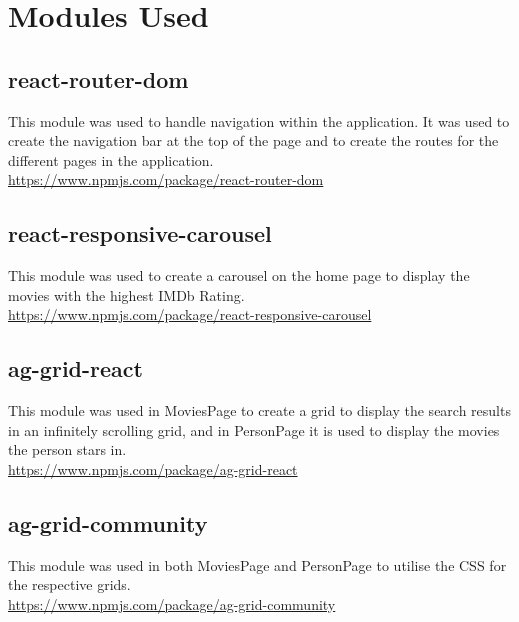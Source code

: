 \documentclass[12pt,a4paper]{article}
\begin{document}
	\newpage

	\section{Modules Used}
		\subsection{react-router-dom}
			This module was used to handle navigation within the application. It was used to create 
			the navigation bar at the top of the page and to create the routes for the different 
			pages in the application.\\

			\href{https://www.npmjs.com/package/react-router-dom}{https://www.npmjs.com/package/react-router-dom}\\
		
		\subsection{react-responsive-carousel}
			This module was used to create a carousel on the home page to display the movies with the 
			highest IMDb Rating.\\

			\href{https://www.npmjs.com/package/react-responsive-carousel}{https://www.npmjs.com/package/react-responsive-carousel}\\
		
		\subsection{ag-grid-react}
			This module was used in MoviesPage to create a grid to display the search results in an infinitely 
			scrolling grid, and in PersonPage it is used to display the movies the person stars in.\\

			\href{https://www.npmjs.com/package/ag-grid-react}{https://www.npmjs.com/package/ag-grid-react}\\
		
		\subsection{ag-grid-community}
			This module was used in both MoviesPage and PersonPage to utilise the CSS for the respective grids.\\

			\href{https://www.npmjs.com/package/ag-grid-community}{https://www.npmjs.com/package/ag-grid-community}\\
	
\end{document}
